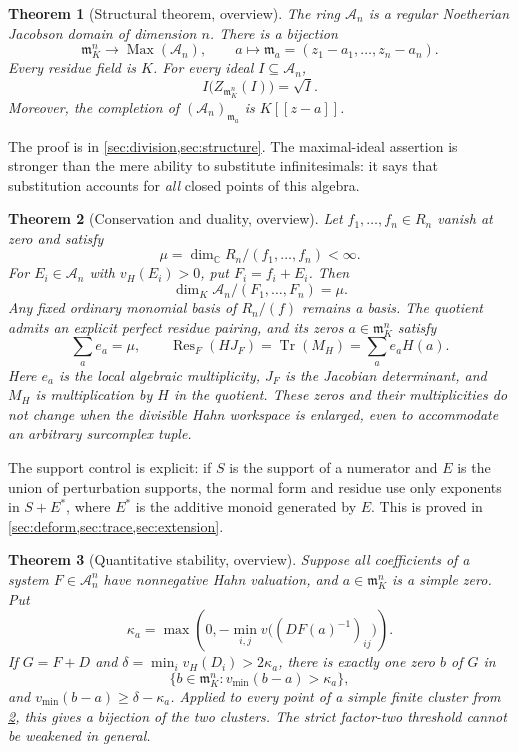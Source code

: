\documentclass[11pt,letterpaper]{article}
\newtheorem{theorem}{Theorem}[section]
\theoremstyle{definition}
\theoremstyle{remark}
\newcommand{\C}{\mathbb C}
\newcommand{\A}{\mathscr A}
\newcommand{\m}{\mathfrak m}
\newcommand{\Res}{\operatorname{Res}}
\newcommand{\Tr}{\operatorname{Tr}}
\newcommand{\Max}{\operatorname{Max}}
\newcommand{\vH}{v_{\!H}}
\newcommand{\vmin}{v_{\min}}
\numberwithin{equation}{section}
\begin{document}
\begin{theorem}[Structural theorem, overview]\label{thm:overview-structure}
The ring $\A_n$ is a regular Noetherian Jacobson domain of dimension $n$. There is a bijection
\[
 \m_K^n\longrightarrow\Max(\A_n),\qquad
 a\longmapsto\m_a=(z_1-a_1,\ldots,z_n-a_n).
\]
Every residue field is $K$. For every ideal $I\subseteq\A_n$,
\[
 I\bigl(Z_{\m_K^n}(I)\bigr)=\sqrt I.
\]
Moreover, the completion of $(\A_n)_{\m_a}$ is $K[[z-a]]$.
\end{theorem}

The proof is in \cref{sec:division,sec:structure}. The maximal-ideal assertion is stronger than the mere ability to substitute infinitesimals: it says that substitution accounts for \emph{all} closed points of this algebra.

\begin{theorem}[Conservation and duality, overview]\label{thm:overview-deform}
Let $f_1,\ldots,f_n\in R_n$ vanish at zero and satisfy
\[
 \mu=\dim_\C R_n/(f_1,\ldots,f_n)<\infty.
\]
For $E_i\in\A_n$ with $\vH(E_i)>0$, put $F_i=f_i+E_i$. Then
\[
 \dim_K\A_n/(F_1,\ldots,F_n)=\mu.
\]
Any fixed ordinary monomial basis of $R_n/(f)$ remains a basis. The quotient admits an explicit perfect residue pairing, and its zeros $a\in\m_K^n$ satisfy
\[
 \sum_a e_a=\mu,\qquad
 \Res_F(HJ_F)=\Tr(M_H)=\sum_a e_aH(a).
\]
Here $e_a$ is the local algebraic multiplicity, $J_F$ is the Jacobian determinant, and $M_H$ is multiplication by $H$ in the quotient. These zeros and their multiplicities do not change when the divisible Hahn workspace is enlarged, even to accommodate an arbitrary surcomplex tuple.
\end{theorem}

The support control is explicit: if $S$ is the support of a numerator and $E$ is the union of perturbation supports, the normal form and residue use only exponents in $S+E^*$, where $E^*$ is the additive monoid generated by $E$. This is proved in \cref{sec:deform,sec:trace,sec:extension}.

\begin{theorem}[Quantitative stability, overview]\label{thm:overview-stability}
Suppose all coefficients of a system $F\in\A_n^n$ have nonnegative Hahn valuation, and $a\in\m_K^n$ is a simple zero. Put
\[
 \kappa_a=\max\left(0,-\min_{i,j}v\bigl((DF(a)^{-1})_{ij}\bigr)\right).
\]
If $G=F+D$ and $\delta=\min_i\vH(D_i)>2\kappa_a$, there is exactly one zero $b$ of $G$ in
\[
 \{b\in\m_K^n:\vmin(b-a)>\kappa_a\},
\]
and $\vmin(b-a)\ge\delta-\kappa_a$. Applied to every point of a simple finite cluster from \cref{thm:overview-deform}, this gives a bijection of the two clusters. The strict factor-two threshold cannot be weakened in general.
\end{theorem}
\end{document}

